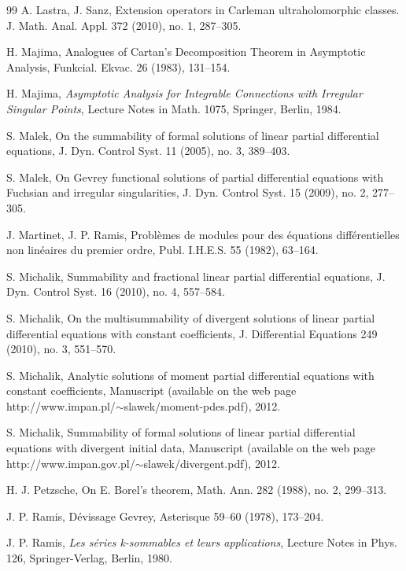 \documentclass[11pt,a4paper,leqno]{article}
\theoremstyle{plain}
\theoremstyle{definition}
\begin{document}
\begin{thebibliography}{99}
 A. Lastra, J. Sanz, Extension operators in Carleman ultraholomorphic classes. J. Math. Anal. Appl. 372 (2010), no. 1, 287--305.

 H. Majima,
Analogues of Cartan's Decomposition Theo\-rem in Asymp\-to\-tic Analysis,
Funkcial. Ekvac. 26 (1983), 131--154.

 H. Majima,
{\it Asymptotic Analysis for Integrable Connections with Irregular
Singular Points}, Lecture Notes in Math. 1075, Springer, Berlin, 1984.

 S. Malek, On the summability of formal solutions of linear partial differential equations, J. Dyn. Control Syst. 11 (2005), no. 3, 389--403.

 S. Malek, On Gevrey functional solutions of partial differential equations with Fuchsian and irregular singularities, J. Dyn. Control Syst. 15 (2009), no. 2, 277--305.

 J. Martinet, J. P. Ramis,
Probl\`{e}mes de modules pour des \'equations diff\'erentielles non
lin\'eaires du premier ordre, Publ. I.H.E.S. 55 (1982), 63--164.

 S. Michalik, Summability and fractional linear partial differential equations, J. Dyn. Control Syst. 16 (2010), no. 4, 557--584.

 S. Michalik, On the multisummability of divergent solutions of linear partial differential equations with constant coefficients, J. Differential Equations 249 (2010), no. 3, 551--570.

 S. Michalik, Analytic solutions of moment partial differential equations with constant coefficients,
Manuscript (available on the web page http://www.impan.pl/$\sim$slawek/moment-pdes.pdf), 2012.

 S. Michalik, Summability of formal solutions of linear partial dif\-ferential equa\-tions with diver\-gent initial data, Manuscript (avail\-able on the web page http://www.impan.gov.pl/$\sim$slawek/divergent.pdf), 2012.

 H. J. Petzsche, On E. Borel's theorem, Math. Ann. 282 (1988), no. 2, 299--313.

 J. P. Ramis,
D\'evissage Gevrey, Asterisque 59--60 (1978), 173--204.

 J. P. Ramis,
{\it Les s\'eries k-sommables et leurs applications}, Lecture Notes in
Phys. 126, Springer-Verlag, Berlin, 1980.


\end{thebibliography}
\end{document}
